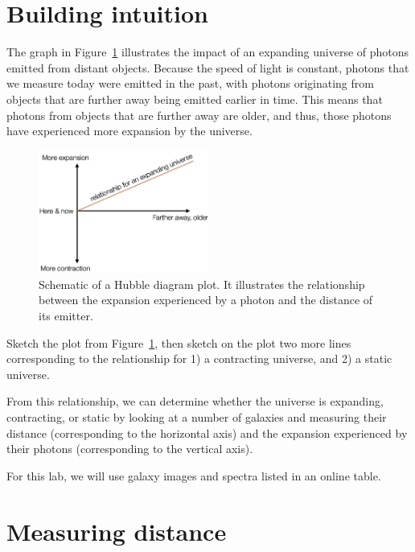\section{Building intuition}

The graph in Figure~\ref{hd:fig:hubble-diagram-schematic} illustrates the impact of an expanding universe of
photons emitted from distant objects. Because the speed of light is
constant, photons that we measure today were emitted in the past, with
photons originating from objects that are further away being emitted
earlier in time. This means that photons from objects that are further
away are older, and thus, those photons have experienced more expansion by the universe.

\begin{figure}
	\centering
	\includegraphics[width=0.5\textwidth]{hubble-diagram/hubble-diagram-schematic}
	\caption{Schematic of a Hubble diagram plot. It illustrates the relationship between the expansion
		experienced by a photon and the distance of its emitter.}\label{hd:fig:hubble-diagram-schematic}
\end{figure}

\begin{steps}
	\item\label{hd:step:sketch} Sketch the plot from Figure~\ref{hd:fig:hubble-diagram-schematic}, then sketch on the plot two more lines corresponding to the
	relationship for 1) a contracting universe, and 2) a static universe.
\end{steps}

From this relationship, we can determine whether the universe is
expanding, contracting, or static by looking at a number of galaxies and
measuring their distance (corresponding to the horizontal axis) and the
expansion experienced by their photons (corresponding to the vertical axis).

For this lab, we will use galaxy images and spectra listed in an online
table.

\section{Measuring distance}


